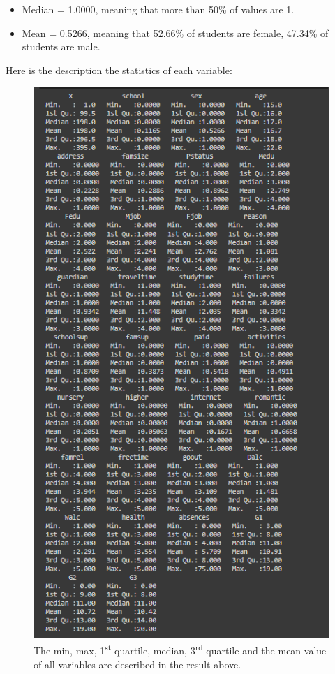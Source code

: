 \documentclass[a4paper]{article}
\begin{document}
\begin{itemize}
    \item Median = 1.0000, meaning that more than 50\% of values are 1.
    \item Mean = 0.5266, meaning that 52.66\% of students are female, 47.34\% of students are male. \\
\end{itemize}
Here is the description the statistics of each variable:
\begin{figure}[H]
    \centering
    \includegraphics[scale = 1.5]{Images/7.PNG}
    \caption{The min, max, 1\textsuperscript{st} quartile, median, 3\textsuperscript{rd} quartile and the mean value of all variables are described in the result above.}
    \label{fig:details}
\end{figure}
\end{document}
